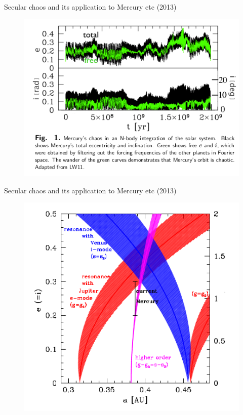 \documentclass{beamer}
\begin{document}
\begin{frame}{Secular chaos and its application to Mercury etc (2013)}
\begin{figure}[h]
\begin{minipage}[h]{0.8\linewidth}
\includegraphics[width=1\linewidth]{./13_1.png}
\end{minipage}
\end{figure}
\end{frame}

\begin{frame}{Secular chaos and its application to Mercury etc (2013)}
\begin{figure}[h]
\begin{minipage}[h]{0.7\linewidth}
\includegraphics[width=1\linewidth]{./13_2.png}
\end{minipage}
\end{figure}
\end{frame}
\end{document}

